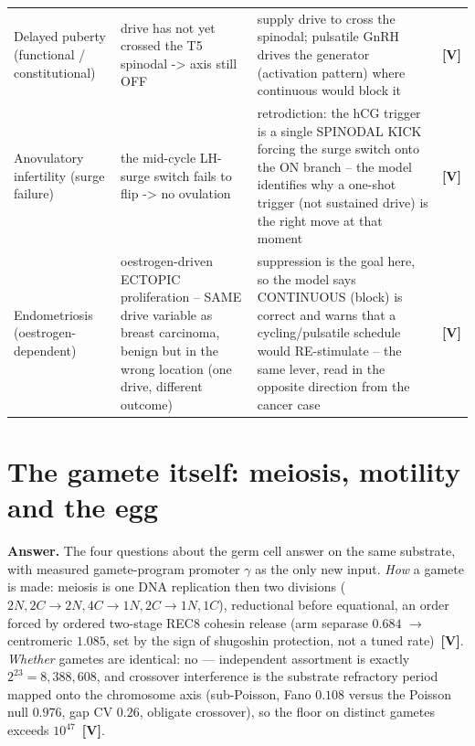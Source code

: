 \documentclass[11pt]{article}
\newcommand{\gradeV}{\textcolor{verified}{\textbf{[V]}}}
\begin{document}
\begin{table}[H]
\begin{tabular}{p{2.6cm}p{4.2cm}p{4.6cm}c}
Delayed puberty (functional / constitutional) & drive has not yet crossed the T5 spinodal -> axis still OFF & supply drive to cross the spinodal; pulsatile GnRH drives the generator (activation pattern) where continuous would block it & \gradeV \\
Anovulatory infertility (surge failure) & the mid-cycle LH-surge switch fails to flip -> no ovulation & retrodiction: the hCG trigger is a single SPINODAL KICK forcing the surge switch onto the ON branch -- the model identifies why a one-shot trigger (not sustained drive) is the right move at that moment & \gradeV \\
Endometriosis (oestrogen-dependent) & oestrogen-driven ECTOPIC proliferation -- SAME drive variable as breast carcinoma, benign but in the wrong location (one drive, different outcome) & suppression is the goal here, so the model says CONTINUOUS (block) is correct and warns that a cycling/pulsatile schedule would RE-stimulate -- the same lever, read in the opposite direction from the cancer case & \gradeV \\
\bottomrule
\end{tabular}
\end{table}

\section{The gamete itself: meiosis, motility and the egg}

\textbf{Answer.} The four questions about the germ cell answer on the same substrate, with measured
gamete-program promoter $\gamma$ as the only new input. \emph{How} a gamete is made: meiosis is one DNA
replication then two divisions ($2N,2C \to 2N,4C \to 1N,2C \to 1N,1C$), reductional before equational, an
order forced by ordered two-stage REC8 cohesin release (arm separase $0.684$
$\to$ centromeric $1.085$, set by the sign of shugoshin
protection, not a tuned rate)~\gradeV{}. \emph{Whether} gametes are identical: no --- independent assortment is
exactly $2^{23}=8,388,608$, and crossover interference
is the substrate refractory period mapped onto the chromosome axis (sub-Poisson, Fano
$0.108$ versus the Poisson null $0.976$, gap
CV $0.26$, obligate crossover), so the floor on distinct gametes exceeds
$10^{47}$~\gradeV{}.
\end{document}
